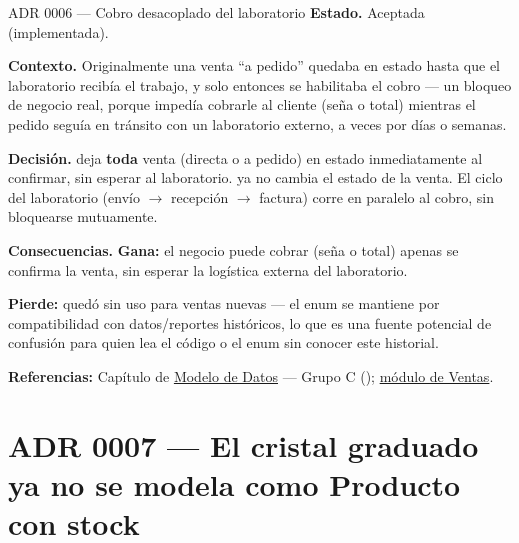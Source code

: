 \begin{cajaADR}{ADR 0006 --- Cobro desacoplado del laboratorio}
\textbf{Estado.} Aceptada (implementada).

\textbf{Contexto.} Originalmente una venta ``a pedido'' quedaba en estado  hasta que el laboratorio recibía el trabajo, y solo entonces se habilitaba el cobro --- un bloqueo de negocio real, porque impedía cobrarle al cliente (seña o total) mientras el pedido seguía en tránsito con un laboratorio externo, a veces por días o semanas.

\textbf{Decisión.} \allowbreak {}\allowbreak {} deja \textbf{toda} venta (directa o a pedido) en estado  inmediatamente al confirmar, sin esperar al laboratorio. \allowbreak {} ya no cambia el estado de la venta. El ciclo del laboratorio (envío $\to$ recepción $\to$ factura) corre en paralelo al cobro, sin bloquearse mutuamente.

\textbf{Consecuencias.} \textbf{Gana:} el negocio puede cobrar (seña o total) apenas se confirma la venta, sin esperar la logística externa del laboratorio.

\textbf{Pierde:} \allowbreak {} quedó sin uso para ventas nuevas --- el enum se mantiene por compatibilidad con datos/reportes históricos, lo que es una fuente potencial de confusión para quien lea el código o el enum sin conocer este historial.
\end{cajaADR}

\textbf{Referencias:} Capítulo de \hyperref[sec:modelo-datos]{Modelo de Datos} --- Grupo C (); \hyperref[mod:08-ventas]{módulo de Ventas}.

\section{ADR 0007 --- El cristal graduado ya no se modela como Producto con stock}
\label{adr:0007}

